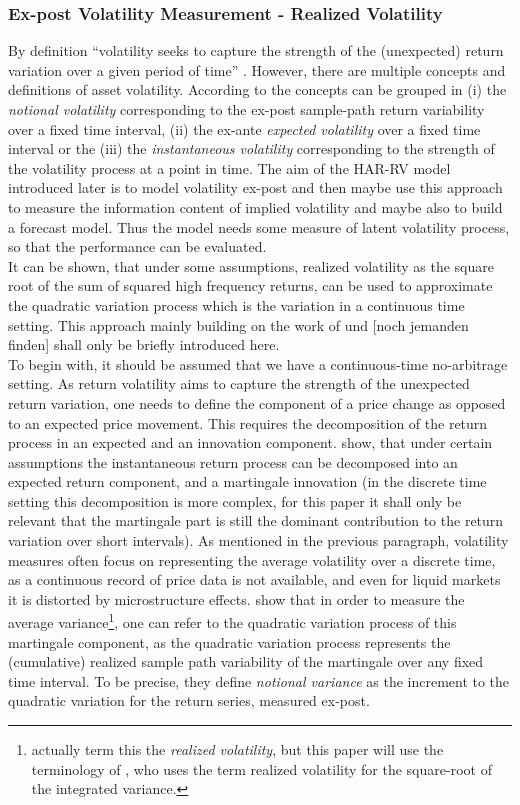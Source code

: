\subsubsection{Ex-post Volatility Measurement - Realized Volatility}\label{sec:221RV}
By definition ``volatility seeks to capture the strength of the (unexpected) return variation over a given period of time'' \parencite[p.7]{andersen2001}. However, there are multiple concepts and definitions of asset volatility. According to \citeauthor{andersen2001} the concepts can be grouped in (i) the \emph{notional volatility} corresponding to the ex-post sample-path return variability over a fixed time interval, (ii) the ex-ante \emph{expected volatility} over a fixed time interval or the (iii) the \emph{instantaneous volatility} corresponding to the strength of the volatility process at a point in time.
The aim of the HAR-RV model introduced later is to model volatility ex-post and then maybe use this approach to measure the information content of implied volatility and maybe also to build a forecast model. Thus the model needs some measure of latent volatility process, so that the performance can be evaluated. \\
It can be shown, that under some assumptions, realized volatility as the square root of the sum of squared high frequency returns, can be used to approximate the quadratic variation process which is the variation in a continuous time setting. This approach mainly building on the work of \citeauthor{andersen2001} und [noch jemanden finden] shall only be briefly introduced here. \\
To begin with, it should be assumed that we have a continuous-time no-arbitrage setting. As return volatility aims to capture the strength of the unexpected return variation, one needs to define the component of a price change as opposed to an expected price movement. This requires the decomposition of the return process in an expected and an innovation component. \citeauthor{andersen2001} show, that under certain assumptions the instantaneous return process can be decomposed into an expected return component, and a martingale innovation (in the discrete time setting this decomposition is more complex, for this paper it shall only be relevant that the martingale part is still the dominant contribution to the return variation over short intervals). As mentioned in the previous paragraph, volatility measures often focus on representing the average volatility over a discrete time, as a continuous record of price data is not available, and even for liquid markets it is distorted by microstructure effects. \textcite{andersen2001} show that in order to measure the average variance\footnote{actually \textcite{andersen2001} term this the \emph{realized volatility}, but this paper will use the terminology of \textcite{corsi2009}, who uses the term realized volatility for the square-root of the integrated variance.}, one can refer to the quadratic variation process of this martingale component, as the quadratic variation process represents the (cumulative) realized sample path variability of the martingale over any fixed time interval. To be precise, they define \emph{notional variance} as the increment to the quadratic variation for the return series, measured ex-post. \\
